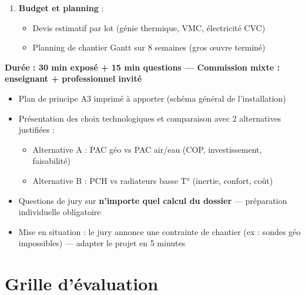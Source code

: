 \begin{methode}
\begin{enumerate}
  \item \textbf{Budget et planning} :
    \begin{itemize}
      \item Devis estimatif par lot (génie thermique, VMC, électricité CVC)
      \item Planning de chantier Gantt sur 8 semaines (gros œuvre terminé)
    \end{itemize}
\end{enumerate}
\end{methode}

\begin{methode}
\textbf{Durée : 30 min exposé + 15 min questions — Commission mixte : enseignant + professionnel invité}

\begin{itemize}
  \item Plan de principe A3 imprimé à apporter (schéma général de l'installation)
  \item Présentation des choix technologiques et comparaison avec 2 alternatives justifiées :
    \begin{itemize}
      \item Alternative A : PAC géo vs PAC air/eau (COP, investissement, faisabilité)
      \item Alternative B : PCH vs radiateurs basse T° (inertie, confort, coût)
    \end{itemize}
  \item Questions de jury sur \textbf{n'importe quel calcul du dossier} — préparation individuelle obligatoire
  \item Mise en situation : le jury annonce une contrainte de chantier (ex : sondes géo impossibles) — adapter le projet en 5 minutes
\end{itemize}
\end{methode}

\section{Grille d'évaluation}

